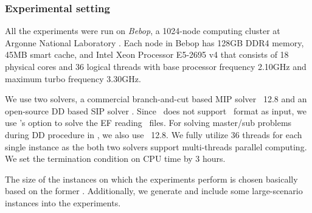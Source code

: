\subsubsection{Experimental setting}
All the experiments were run on \textit{Bebop}, a 1024-node computing cluster at Argonne National Laboratory \cite{bebop}. Each node in Bebop has 128GB DDR4 memory, 45MB smart cache, and Intel Xeon Processor E5-2695 v4 that consists of 18 physical cores and 36 logical threads with base processor frequency 2.10GHz and maximum turbo frequency 3.30GHz. 

We use two solvers, a commercial branch-and-cut based MIP solver \cplex\ 12.8 and an open-source DD based SIP solver \dsp. Since \cplex\ does not support \smps\ format as input, we use \dsp's option to solve the EF reading \smps\ files. For solving master/sub problems during DD procedure in \dsp, we also use \cplex\ 12.8. We fully utilize 36 threads for each single instance as the both two solvers support multi-threads parallel computing. We set the termination condition on CPU time by 3 hours.  

The size of the instances on which the experiments perform is chosen basically based on the former \siplib. Additionally, we generate and include some large-scenario instances into the experiments.


